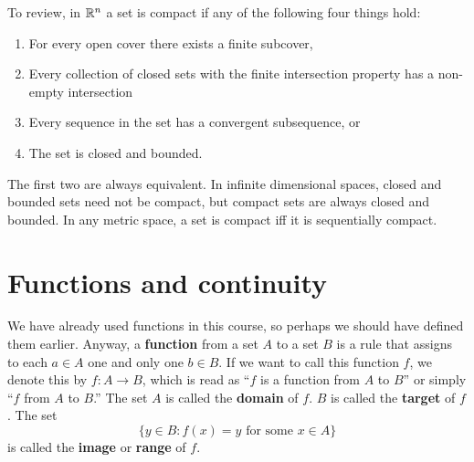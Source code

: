 To review, in $\mathbb{R}^n$ a set is compact if any of the following four
things hold:
\begin{enumerate}
\item For every open cover there exists a finite subcover,
\item Every collection of closed sets with the finite intersection
  property has a non-empty intersection
\item Every sequence in the set has a convergent subsequence, or
\item The set is closed and bounded.
\end{enumerate}
The first two are always equivalent. 
In infinite dimensional spaces, closed and bounded sets need not be
compact, but compact sets are always closed and bounded. In any metric
space, a set is compact iff it is sequentially compact.

\section{Functions and continuity}

We have already used functions in this course, so perhaps we should
have defined them earlier. Anyway, a \textbf{function} from a set $A$
to a set $B$ is a rule that assigns to each $a \in A$ one and only one
$b \in B$. If we want to call this function $f$, we denote this by
$f:A \to B$, which is read as ``$f$ is a function from $A$ to $B$'' or
simply ``$f$ from $A$ to $B$.'' The set $A$ is called the
\textbf{domain} of $f$. $B$ is called the \textbf{target} of $f$. The
set 
\[ \{y  \in B:  f(x) = y \text{ for some } x \in A \} \]
is called the \textbf{image} or \textbf{range} of $f$. 



